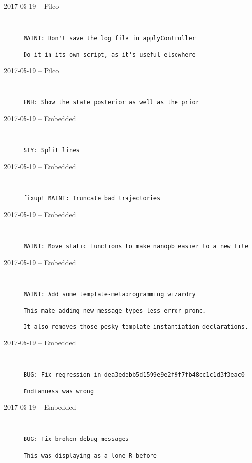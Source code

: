 \begin{description}
  \item[2017-05-19 -- Pilco] \hfill \
\begin{lstlisting}
MAINT: Don't save the log file in applyController

Do it in its own script, as it's useful elsewhere
\end{lstlisting}


  \item[2017-05-19 -- Pilco] \hfill \
\begin{lstlisting}
ENH: Show the state posterior as well as the prior
\end{lstlisting}


  \item[2017-05-19 -- Embedded] \hfill \
\begin{lstlisting}
STY: Split lines
\end{lstlisting}


  \item[2017-05-19 -- Embedded] \hfill \
\begin{lstlisting}
fixup! MAINT: Truncate bad trajectories
\end{lstlisting}


  \item[2017-05-19 -- Embedded] \hfill \
\begin{lstlisting}
MAINT: Move static functions to make nanopb easier to a new file
\end{lstlisting}


  \item[2017-05-19 -- Embedded] \hfill \
\begin{lstlisting}
MAINT: Add some template-metaprogramming wizardry

This make adding new message types less error prone.

It also removes those pesky template instantiation declarations.
\end{lstlisting}


  \item[2017-05-19 -- Embedded] \hfill \
\begin{lstlisting}
BUG: Fix regression in dea3edebb5d1599e9e2f9f7fb48ec1c1d3f3eac0

Endianness was wrong
\end{lstlisting}


  \item[2017-05-19 -- Embedded] \hfill \
\begin{lstlisting}
BUG: Fix broken debug messages

This was displaying as a lone R before
\end{lstlisting}



\end{description}
